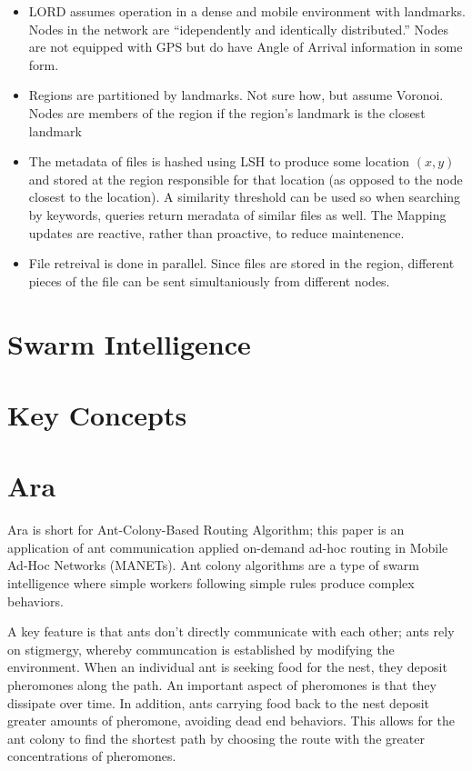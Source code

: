 \documentclass[a4paper]{article}
\begin{document}
\begin{itemize}
		\item LORD assumes operation in a dense and mobile environment with landmarks.  Nodes in the network are ``idependently and identically distributed.''  Nodes are not equipped with GPS but do have Angle of Arrival information in some form.
	\item Regions are partitioned by landmarks.  Not sure how, but assume Voronoi.  Nodes are members of the region if the region's landmark is the closest landmark
	\item The metadata of files is hashed using LSH \cite{datar2004locality} to produce some location $(x,y)$  and stored at the region responsible for that location (as opposed to the node closest to the location).   A similarity threshold can be used so when searching by keywords, queries return meradata of similar files as well.  The  Mapping updates are reactive, rather than proactive, to reduce maintenence.
	\item File retreival is done in parallel.  Since files are stored in the region, different pieces of the file can be sent simultaniously from different nodes.



\end{itemize}


\section{Swarm Intelligence}

\section{Key Concepts}

\section{Ara}
Ara \cite{ara-ants} is short for Ant-Colony-Based Routing Algorithm; this paper is an application of ant communication applied on-demand ad-hoc routing in Mobile Ad-Hoc Networks (MANETs).
Ant colony algorithms are a type of swarm intelligence where simple workers following simple rules produce complex behaviors.  


A key feature is that ants don't directly communicate with each other; ants rely on stigmergy, whereby communcation is established by modifying the environment.
When an individual ant is seeking food for the nest, they deposit pheromones along the path.  An important aspect of pheromones is that they dissipate over time.  In addition, ants carrying food back to the nest deposit greater amounts of pheromone, avoiding dead end behaviors.  This allows for the ant colony to find the shortest path by choosing the route with the greater concentrations of pheromones. 
\end{document}
